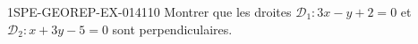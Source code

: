 \begin{exercice}{1SPE-GEOREP-EX-014}{1}{10}
Montrer que les droites $\mathcal{D}_1 : 3x - y + 2 = 0$ et $\mathcal{D}_2 : x + 3y - 5 = 0$ sont perpendiculaires.
\end{exercice}
